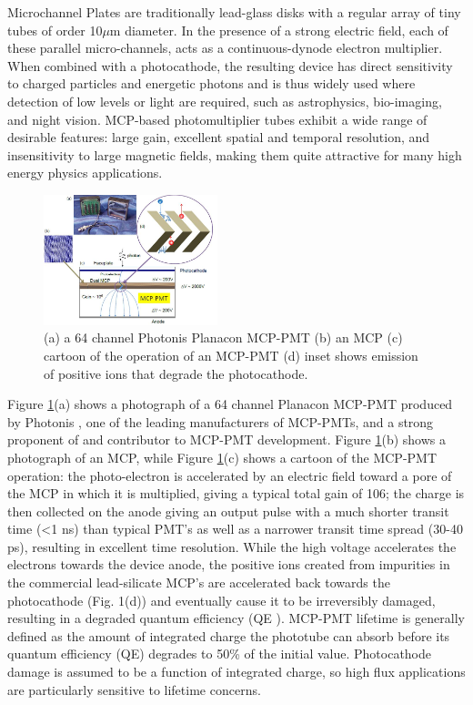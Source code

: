 
Microchannel Plates are traditionally lead-glass disks with a regular array of tiny tubes of order 10$\mu$m diameter. In the presence of a strong electric field, each of these parallel micro-channels, acts as a continuous-dynode electron multiplier. When combined with a photocathode, the resulting device has direct sensitivity to charged particles and energetic photons and is thus widely used where detection of low levels or light are required, such as astrophysics, bio-imaging, and night vision. MCP-based photomultiplier tubes exhibit a wide range of desirable features: large gain, excellent spatial and temporal resolution, and insensitivity to large magnetic fields, making them quite attractive for many high energy physics applications.

\begin{figure}[htb]
\centering
\includegraphics[width=0.45\textwidth]{images/figure1Brandt.jpg}
\caption[]{(a) a 64 channel Photonis Planacon MCP-PMT (b) an MCP (c) cartoon of the operation of an MCP-PMT (d) inset shows emission of positive ions that degrade the photocathode.}
\label{fig:PlanCon}
\end{figure}

Figure \ref{fig:PlanCon}(a) shows a photograph of a 64 channel Planacon MCP-PMT produced by Photonis \cite{Photonis}, one of the leading manufacturers of MCP-PMTs, and a strong proponent of and contributor to MCP-PMT development. Figure \ref{fig:PlanCon}(b) shows a photograph of an MCP, while Figure \ref{fig:PlanCon}(c) shows a cartoon of the MCP-PMT operation: the photo-electron is accelerated by an electric field toward a pore of the MCP in which it is multiplied, giving a typical total gain of 106; the charge is then collected on the anode giving an output pulse with a much shorter transit time (<1 ns) than typical PMT’s as well as a narrower transit time spread (30-40 ps), resulting in excellent time resolution.   While the high voltage accelerates the electrons towards the device anode, the positive ions created from impurities in the commercial lead-silicate MCP’s are accelerated back towards the photocathode (Fig. 1(d)) and eventually cause it to be irreversibly damaged, resulting in a degraded quantum efficiency (QE ).    MCP-PMT lifetime is generally defined as the amount of integrated charge the phototube can absorb before its quantum efficiency (QE) degrades to 50\% of the initial value\cite{life}.  Photocathode damage is assumed to be a function of integrated charge, so high flux applications are particularly sensitive to lifetime concerns.  

